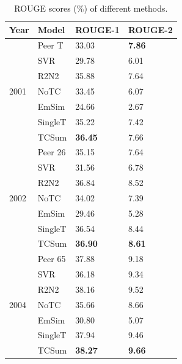 \documentclass[letterpaper]{article}
\begin{document}
\begin{table}[]
\centering
\small
\begin{tabular}{l|lll}
\hline
Year                  & Model   & ROUGE-1 & ROUGE-2 \\ \hline
\multirow{7}{*}{2001} & Peer T  & 33.03   & \textbf{7.86}    \\
& SVR     & 29.78   & 6.01    \\
& R2N2    & 35.88   & 7.64    \\ \cline{2-4}
& NoTC    & 33.45   & 6.07    \\
& EmSim   & 24.66   & 2.67    \\
& SingleT & 35.22   & 7.42    \\
& TCSum   & \textbf{36.45}   & 7.66    \\ \hline
\multirow{7}{*}{2002} & Peer 26 & 35.15   & 7.64    \\
& SVR     & 31.56   & 6.78    \\
& R2N2    & 36.84   & 8.52    \\ \cline{2-4}
& NoTC    & 34.02   & 7.39    \\
& EmSim   & 29.46   & 5.28    \\
& SingleT & 36.54   & 8.44    \\
& TCSum   & \textbf{36.90}   & \textbf{8.61}    \\ \hline
\multirow{7}{*}{2004} & Peer 65 & 37.88   & 9.18    \\
& SVR     & 36.18   & 9.34    \\
& R2N2    & 38.16   & 9.52    \\ \cline{2-4}
& NoTC    & 35.66   & 8.66    \\
& EmSim   & 30.80   & 5.07    \\
& SingleT & 37.94   & 9.46    \\
& TCSum   & \textbf{38.27}   & \textbf{9.66}    \\ \hline
\end{tabular}
\caption{ROUGE scores (\%) of different methods.}
\label{tb:rouge}
\end{table}
\end{document}
